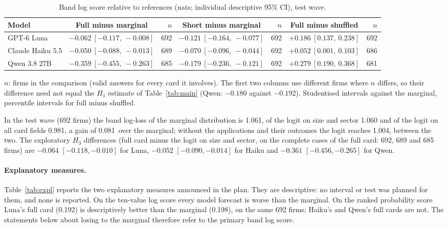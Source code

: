 \documentclass[11pt]{article}
\newcommand{\nats}{\,\text{nats}}
\begin{document}
\begin{table}[ht]
\centering
\begin{threeparttable}
\caption{Band log score relative to references (nats; individual descriptive 95\% CI), test wave.}
\label{tab:ref}
\footnotesize
\setlength{\tabcolsep}{3pt}
\begin{tabular}{lcrcrcr}
\toprule
Model & Full minus marginal & $n$ & Short minus marginal & $n$ & Full minus shuffled & $n$\\
\midrule
GPT-6 Luna & $-0.062\ [-0.117,\ -0.008]$ & 692 & $-0.121\ [-0.164,\ -0.077]$ & 692 & $+0.186\ [0.137,\ 0.238]$ & 692\\
Claude Haiku 5.5 & $-0.050\ [-0.088,\ -0.013]$ & 689 & $-0.070\ [-0.096,\ -0.044]$ & 692 & $+0.052\ [0.001,\ 0.103]$ & 686\\
Qwen 3.8 27B & $-0.359\ [-0.455,\ -0.263]$ & 685 & $-0.179\ [-0.236,\ -0.121]$ & 692 & $+0.279\ [0.190,\ 0.368]$ & 681\\
\bottomrule
\end{tabular}
\begin{tablenotes}\footnotesize
\item $n$: firms in the comparison (valid answers for every card it involves). The first two columns use different
firms where $n$ differs, so their difference need not equal the $H_1$ estimate of Table~\ref{tab:main} (Qwen:
$-0.180$ against $-0.192$). Studentised intervals against the marginal, percentile intervals for full minus shuffled.
\end{tablenotes}
\end{threeparttable}
\end{table}

In the test wave (692 firms) the band log-loss of the marginal distribution is 1.061, of the logit on size and sector
1.060 and of the logit on all card fields 0.981, a gain of 0.081\nats{} over the marginal; without the applications
and their outcomes the logit reaches 1.004, between the two. The exploratory $H_3$ differences (full card minus the
logit on size and sector, on the complete cases of the full card: 692, 689 and 685 firms) are $-0.064$
$[-0.118, -0.010]$ for Luna, $-0.052$ $[-0.090, -0.014]$ for Haiku and $-0.361$ $[-0.456, -0.265]$ for Qwen.

\paragraph{Explanatory measures.} Table~\ref{tab:expl} reports the two explanatory measures announced in the plan.
They are descriptive: no interval or test was planned for them, and none is reported. On the ten-value log score
every model forecast is worse than the marginal. On the ranked probability score Luna's full card (0.192) is
descriptively better than the marginal (0.198), on the same 692 firms; Haiku's and Qwen's full cards are not. The
statements below about losing to the marginal therefore refer to the primary band log score.
\end{document}
